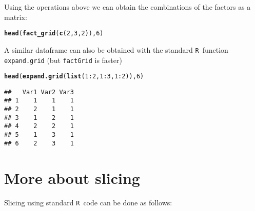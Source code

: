 \documentclass[10pt]{article}\usepackage[]{graphicx}\usepackage[]{xcolor}
\makeatletter
\newcommand{\hlnum}[1]{\textcolor[rgb]{0.686,0.059,0.569}{#1}}%
\newcommand{\hlopt}[1]{\textcolor[rgb]{0,0,0}{#1}}%
\newcommand{\hlstd}[1]{\textcolor[rgb]{0.345,0.345,0.345}{#1}}%
\newcommand{\hlkwd}[1]{\textcolor[rgb]{0.737,0.353,0.396}{\textbf{#1}}}%
\newenvironment{kframe}{%
 \def\at@end@of@kframe{}%
 \ifinner\ifhmode%
  \def\at@end@of@kframe{\end{minipage}}%
  \begin{minipage}{\columnwidth}%
 \fi\fi%
 \def\FrameCommand##1{\hskip\@totalleftmargin \hskip-\fboxsep
 \colorbox{shadecolor}{##1}\hskip-\fboxsep
     \hskip-\linewidth \hskip-\@totalleftmargin \hskip\columnwidth}%
 \MakeFramed {\advance\hsize-\width
   \@totalleftmargin\z@ \linewidth\hsize
   \@setminipage}}%
 {\par\unskip\endMakeFramed%
 \at@end@of@kframe}
\newenvironment{knitrout}{}{} %
\def\code#1{\texttt{#1}}
\def\R{\texttt{R}}
\makeatother
\begin{document}
Using the operations above we can obtain the combinations of the
factors as a matrix:

\begin{knitrout}\small
{}\color{fgcolor}\begin{kframe}
\begin{alltt}
\hlkwd{head}\hlstd{(} \hlkwd{fact_grid}\hlstd{(} \hlkwd{c}\hlstd{(}\hlnum{2}\hlstd{,} \hlnum{3}\hlstd{,} \hlnum{2}\hlstd{) ),} \hlnum{6} \hlstd{)}
\end{alltt}


{\ttfamily\noindent\bfseries{}}\end{kframe}
\end{knitrout}

A similar dataframe can also be obtained with the standard \R\
function \code{expand.grid} (but \code{factGrid} is faster)
\begin{knitrout}\small
{}\color{fgcolor}\begin{kframe}
\begin{alltt}
\hlkwd{head}\hlstd{(} \hlkwd{expand.grid}\hlstd{(}\hlkwd{list}\hlstd{(}\hlnum{1}\hlopt{:}\hlnum{2}\hlstd{,} \hlnum{1}\hlopt{:}\hlnum{3}\hlstd{,} \hlnum{1}\hlopt{:}\hlnum{2}\hlstd{)),} \hlnum{6} \hlstd{)}
\end{alltt}
\begin{verbatim}
##   Var1 Var2 Var3
## 1    1    1    1
## 2    2    1    1
## 3    1    2    1
## 4    2    2    1
## 5    1    3    1
## 6    2    3    1
\end{verbatim}
\end{kframe}
\end{knitrout}



\appendix

\section{More about slicing}
\label{sec:more-about-slicing}

Slicing using standard \R\ code can be done as follows:
\end{document}
